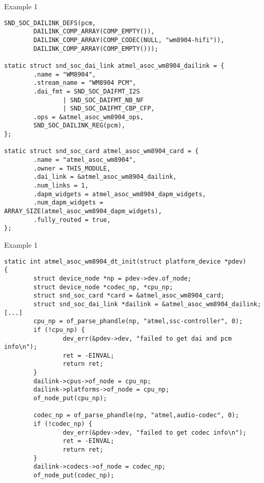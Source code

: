 \begin{frame}[fragile]{Example 1}
  \begin{block}{}
    \fontsize{8}{8}\selectfont
    \begin{verbatim}
SND_SOC_DAILINK_DEFS(pcm,
        DAILINK_COMP_ARRAY(COMP_EMPTY()),
        DAILINK_COMP_ARRAY(COMP_CODEC(NULL, "wm8904-hifi")),
        DAILINK_COMP_ARRAY(COMP_EMPTY()));

static struct snd_soc_dai_link atmel_asoc_wm8904_dailink = {
        .name = "WM8904",
        .stream_name = "WM8904 PCM",
        .dai_fmt = SND_SOC_DAIFMT_I2S
                | SND_SOC_DAIFMT_NB_NF
                | SND_SOC_DAIFMT_CBP_CFP,
        .ops = &atmel_asoc_wm8904_ops,
        SND_SOC_DAILINK_REG(pcm),
};

static struct snd_soc_card atmel_asoc_wm8904_card = {
        .name = "atmel_asoc_wm8904",
        .owner = THIS_MODULE,
        .dai_link = &atmel_asoc_wm8904_dailink,
        .num_links = 1,
        .dapm_widgets = atmel_asoc_wm8904_dapm_widgets,
        .num_dapm_widgets = ARRAY_SIZE(atmel_asoc_wm8904_dapm_widgets),
        .fully_routed = true,
};
    \end{verbatim}
  \end{block}
\end{frame}

\begin{frame}[fragile]{Example 1}
  \begin{block}{}
    \fontsize{8}{8}\selectfont
    \begin{verbatim}
static int atmel_asoc_wm8904_dt_init(struct platform_device *pdev)
{
        struct device_node *np = pdev->dev.of_node;
        struct device_node *codec_np, *cpu_np;
        struct snd_soc_card *card = &atmel_asoc_wm8904_card;
        struct snd_soc_dai_link *dailink = &atmel_asoc_wm8904_dailink;
[...]
        cpu_np = of_parse_phandle(np, "atmel,ssc-controller", 0);
        if (!cpu_np) {
                dev_err(&pdev->dev, "failed to get dai and pcm info\n");
                ret = -EINVAL;
                return ret;
        }
        dailink->cpus->of_node = cpu_np;
        dailink->platforms->of_node = cpu_np;
        of_node_put(cpu_np);

        codec_np = of_parse_phandle(np, "atmel,audio-codec", 0);
        if (!codec_np) {
                dev_err(&pdev->dev, "failed to get codec info\n");
                ret = -EINVAL;
                return ret;
        }
        dailink->codecs->of_node = codec_np;
        of_node_put(codec_np);
    \end{verbatim}
  \end{block}
\end{frame}

